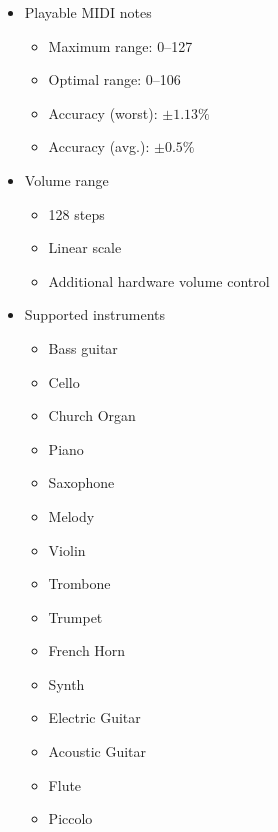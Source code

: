 \begin{itemize}
\item Playable MIDI notes
    \begin{itemize}
    \item Maximum range: 0--127
    \item Optimal range: 0--106
    \item Accuracy (worst): $\pm1.13\%$
    \item Accuracy (avg.): $\pm0.5\%$
    \end{itemize}
\item Volume range
    \begin{itemize}
    \item 128 steps
    \item Linear scale
    \item Additional hardware volume control
    \end{itemize}
\item Supported instruments
    \begin{itemize}
    \item Bass guitar
    \item Cello
    \item Church Organ
    \item Piano
    \item Saxophone
    \item Melody
    \item Violin
    \item Trombone
    \item Trumpet
    \item French Horn
    \item Synth
    \item Electric Guitar
    \item Acoustic Guitar
    \item Flute
    \item Piccolo
    \end{itemize}
\end{itemize}

